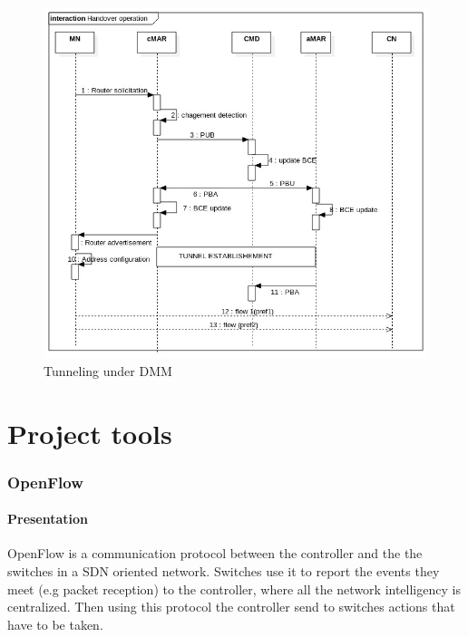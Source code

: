 \documentclass{article}
\begin{document}
\begin{figure}[h!]
  \centering
    \includegraphics[scale=0.5]{reportPictures/figure8.jpg}
  \caption{Tunneling under DMM}
\end{figure}


\part{Project tools}

\section{OpenFlow}

\subsection{Presentation}
OpenFlow is a communication protocol between the controller and the
the switches in a SDN oriented network. Switches use it to report the
events they meet (e.g packet reception) to the controller, where all
the network intelligency is centralized. Then using this protocol the
controller send to switches actions that have to be taken.
\end{document}
